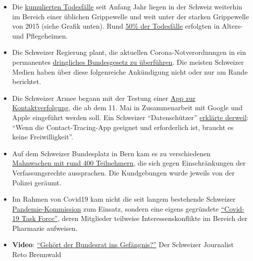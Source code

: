 \begin{itemize}
\tightlist
\item
  Die
  \href{https://swprs.files.wordpress.com/2020/05/schweiz-todesfaelle-2010-2020_woche_17.pdf}{kumulierten
  Todesfälle} seit Anfang Jahr liegen in der Schweiz weiterhin im
  Bereich einer üblichen Grippewelle und weit unter der starken
  Grippewelle von 2015 (siehe Grafik unten). Rund
  \href{https://www.bluewin.ch/de/news/schweiz/sp-chef-levrat-will-die-reichen-schropfen-383977.html}{50\%
  der Todesfälle} erfolgten in Alters- und Pflegeheimen.
\item
  Die Schweizer Regierung plant, die aktuellen Corona-Notverordnungen in
  ein permanentes
  \href{https://www.admin.ch/gov/de/start/dokumentation/medienmitteilungen.msg-id-78929.html}{dringliches
  Bundesgesetz zu überführen}. Die meisten Schweizer Medien haben über
  diese folgenreiche Ankündigung nicht oder nur am Rande berichtet.
\item
  Die Schweizer Armee begann mit der Testung einer
  \href{https://uncut-news.ch/wp-content/uploads/2020/05/Schweizer-Soldaten-k\%C3\%A4mpfen-bewaffnet-mit-Bluetooth-App-gegen-COVID-19.pdf}{App
  zur Kontaktverfolgung}, die ab dem 11. Mai in Zusammenarbeit mit
  Google und Apple eingeführt werden soll. Ein Schweizer
  ``Datenschützer''
  \href{https://www.nzz.ch/zuerich/coronavirus-in-zuerich-tracing-app-braucht-keine-freiwilligkeit-ld.1553964}{erklärte
  derweil}: ``Wenn die Contact-Tracing-App geeignet und erforderlich
  ist, braucht es keine Freiwilligkeit''.
\item
  Auf dem Schweizer Bundesplatz in Bern kam es zu verschiedenen
  \href{https://www.zeitpunkt.ch/index.php/mahnwache-fuer-grundrechte-400-menschen-auf-dem-bundesplatz-wie-aus-dem-nichts}{Mahnwachen
  mit rund 400 Teilnehmern}, die sich gegen Einschränkungen der
  Verfassungsrechte aussprachen. Die Kundgebungen wurde jeweils von der
  Polizei geräumt.
\item
  Im Rahmen von Covid19 kam nicht die seit langem bestehende Schweizer
  \href{https://www.srf.ch/news/schweiz/bag-verzichtete-auf-beratung-was-macht-die-pandemie-kommission-in-der-krise}{Pandemie-Kommission}
  zum Einsatz, sondern eine eigens gegründete
  \href{https://ncs-tf.ch/de/organisation}{``Covid-19 Task Force''},
  deren Mitglieder teilweise Interessenskonflikte im Bereich der
  Pharmazie aufweisen.
\item
  \textbf{Video}:
  \href{https://www.youtube.com/watch?v=RyZGkdeQ6CY}{``Gehört der
  Bundesrat ins Gefängnis?''} Der Schweizer Journalist Reto Brennwald

\end{itemize}
